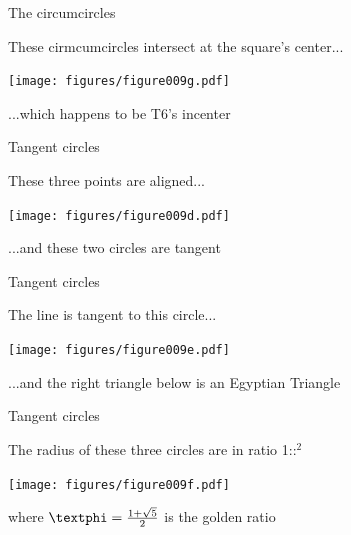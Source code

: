 \documentclass[14pt]{beamer}
\begin{document}

    \begin{frame}{The circumcircles}
        \begin{center}
            These cirmcumcircles intersect at the square's center...
        \end{center}
        \vspace{0.90em}
        \hspace{5.25em} \texttt{[image: figures/figure009g.pdf]} \\
        \begin{center}
            ...which happens to be T6's incenter
        \end{center}
    \end{frame}


    \begin{frame}{Tangent circles}
        \begin{center}
            These three points are aligned...
        \end{center}
        \hspace{3.92em} \texttt{[image: figures/figure009d.pdf]} \\
        \begin{center}
             ...and these two circles are tangent
        \end{center}
    \end{frame}


    \begin{frame}{Tangent circles}
        \begin{center}
            The line is tangent to this circle...
        \end{center}
        \hspace{6.18em} \texttt{[image: figures/figure009e.pdf]} \\
        \begin{center}
             ...and the right triangle below is an Egyptian Triangle
        \end{center}
    \end{frame}


    \begin{frame}{Tangent circles}
        \begin{center}
            The radius of these three circles are in ratio 1:\textphi:\textphi$^2$
        \end{center}\medskip
        \hspace{6.18em} \texttt{[image: figures/figure009f.pdf]} \\
        \begin{center}
             where $\text{\textphi} =\tfrac{1+\sqrt{5}}{2}$ is the golden ratio
        \end{center}
    \end{frame}
\end{document}

